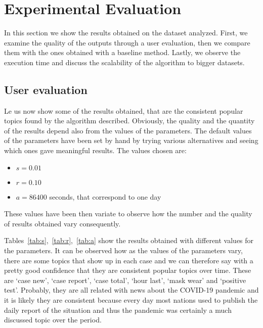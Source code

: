 \section{Experimental Evaluation} 
\label{sec:eval}
In this section we show the results obtained on the dataset analyzed. First, we 
examine the quality of the outputs through a user evaluation, then we compare them with 
the ones obtained with a baseline method.
Lastly, we observe the execution time and discuss the scalability of the algorithm to 
bigger datasets.

\subsection{User evaluation}
Le us now show some of the results obtained, that are the consistent popular topics found
by the algorithm described. Obviously, the quality and the quantity of the results depend
also from the values of the parameters.
The default values of the parameters have been set by hand by trying various alternatives
and seeing which ones gave meaningful results. The values chosen are:
\begin{itemize}
    \item $s = 0.01$
    \item $r = 0.10$
    \item $a = 86400$ seconds, that correspond to one day
\end{itemize}
These values have been then variate to observe how the number and the quality of results 
obtained vary consequently. 







Tables~\ref{tab:s},~\ref{tab:r},~\ref{tab:a} show the results obtained with different values for the parameters.
It can be observed how as the values of the parameters vary, there are some topics that show up in each case
and we can therefore say with a pretty good confidence that they are consistent popular topics over time.
These are `case new', `case report', `case total', `hour last', `mask wear' and `positive test'. Probably, they 
are all related with news about the COVID-19 pandemic and it is likely they are consistent because every day 
most nations used to publish the daily report of the situation and thus the pandemic was certainly a much discussed
topic over the period.



